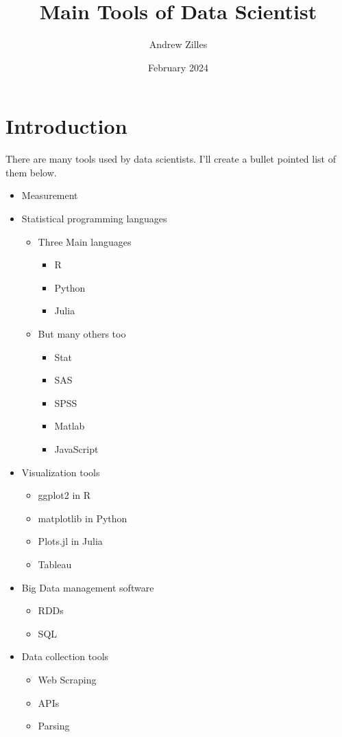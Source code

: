 \documentclass{article}
\title{Main Tools of Data Scientist}
\author{Andrew Zilles}
\date{February 2024}
\begin{document}
\maketitle

\section{Introduction}
There are many tools used by data scientists. I'll create a bullet pointed list of them below.
\begin{itemize}
    \item Measurement
    \item Statistical programming languages
    \begin{itemize}
        \item Three Main languages
        \begin{itemize}
            \item R
        \end{itemize}
        \begin{itemize}
            \item Python
        \end{itemize}
        \begin{itemize}
            \item Julia
        \end{itemize}
        \item But many others too
        \begin{itemize}
            \item Stat
            \item SAS
            \item SPSS
            \item Matlab
            \item JavaScript
        \end{itemize}
        \end{itemize}
    \item Visualization tools
    \begin{itemize}
        \item ggplot2 in R
        \item matplotlib in Python
        \item Plots.jl in Julia
        \item Tableau
    \end{itemize}
    \item Big Data management software
    \begin{itemize}
        \item RDDs
        \item SQL
    \end{itemize}
    \item Data collection tools
    \begin{itemize}
        \item Web Scraping
        \item APIs
        \item Parsing
    \end{itemize}
\end{itemize}
\end{document}
